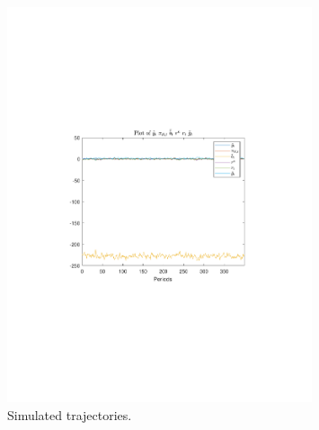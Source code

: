  
\begin{figure}[H]
\centering 
\includegraphics[width=0.80\textwidth]{nash/graphs/SimulatedTrajectory_y}
\caption{Simulated trajectories.}\label{Fig:SimulatedTrajectory_:y}
\end{figure}


